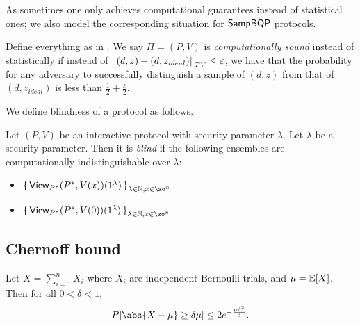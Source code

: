 As sometimes one only achieves computational guarantees instead of statistical ones;
we also model the corresponding situation for $\operatorname{\mathsf{SampBQP}}$ protocols.

\begin{definition}
	Define everything as in .
	We say $\Pi=(P, V)$ is \emph{computationally sound} instead of statistically if instead of 
	$\left\lVert(d,z)-(d,z_{ideal})\right\rVert_{TV}\leq\varepsilon$,
	we have that the probability for any adversary to successfully distinguish a sample of $(d, z)$ from that of $(d, z_{ideal})$ is less than $\frac{1}{2}+\frac{\varepsilon}{2}$.
\end{definition}

We define blindness of a protocol as follows. 

\begin{definition}
	Let $(P, V)$ be an interactive protocol with security parameter $\lambda$.  
	Let $\lambda$ be a security parameter.
	Then it is \emph{blind} if the following ensembles are computationally indistinguishable over $\lambda$:
	\begin{itemize}
		\item $\set{\View_{P^*}(P^*, V(x))(1^\lambda)}_{\lambda\in\bbN, x\in\zo^n}$
		\item $\set{\View_{P^*}(P^*, V(0))(1^\lambda)}_{\lambda\in\bbN, x\in\zo^n}$
	\end{itemize}
\end{definition}

\subsection{Chernoff bound}

\begin{thm}
\label{thm:Chernoff}
Let $X=\sum_{i=1}^n X_i$ where $X_i$ are independent Bernoulli trials, and $\mu=\operatorname*{\mathbb{E}}[X]$.
Then for all $0<\delta<1$,
$$P[\abs{X-\mu}\geq\delta\mu]\leq2e^{-\frac{\mu\delta^2}{3}}.$$
\end{thm}



